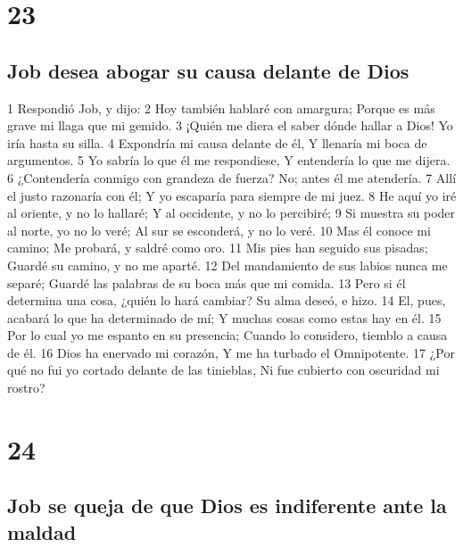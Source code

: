 \chapter{23}

\section*{Job desea abogar su causa delante de Dios}

1 Respondió Job, y dijo:
2 Hoy también hablaré con amargura;
Porque es más grave mi llaga que mi gemido.
3 ¡Quién me diera el saber dónde hallar a Dios!
Yo iría hasta su silla.
4 Expondría mi causa delante de él,
Y llenaría mi boca de argumentos.
5 Yo sabría lo que él me respondiese,
Y entendería lo que me dijera.
6 ¿Contendería conmigo con grandeza de fuerza? 
No; antes él me atendería.
7 Allí el justo razonaría con él;
Y yo escaparía para siempre de mi juez.
8 He aquí yo iré al oriente, y no lo hallaré;
Y al occidente, y no lo percibiré;
9 Si muestra su poder al norte, yo no lo veré;
Al sur se esconderá, y no lo veré.
10 Mas él conoce mi camino;
Me probará, y saldré como oro.
11 Mis pies han seguido sus pisadas;
Guardé su camino, y no me aparté.
12 Del mandamiento de sus labios nunca me separé;
Guardé las palabras de su boca más que mi comida.
13 Pero si él determina una cosa, ¿quién lo hará cambiar?
Su alma deseó, e hizo.
14 El, pues, acabará lo que ha determinado de mí;
Y muchas cosas como estas hay en él.
15 Por lo cual yo me espanto en su presencia;
Cuando lo considero, tiemblo a causa de él.
16 Dios ha enervado mi corazón, 
Y me ha turbado el Omnipotente.
17 ¿Por qué no fui yo cortado delante de las tinieblas,
Ni fue cubierto con oscuridad mi rostro?

\chapter{24}

\section*{Job se queja de que Dios es indiferente ante la maldad}

